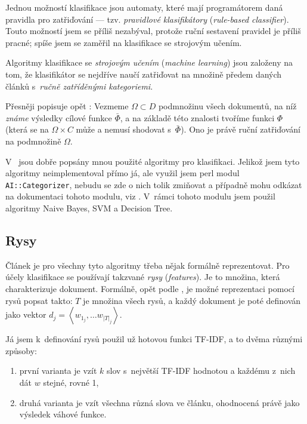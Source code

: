 \documentclass[12pt,a4paper]{report}
\begin{document}
Jednou možností klasifikace jsou automaty, které mají programátorem daná pravidla pro zatřiďování --- tzv. \emph{pravidlové klasifikátory} (\emph{rule-based classifier}). Touto možností jsem se příliš nezabýval, protože ruční sestavení pravidel je příliš pracné; spíše jsem se zaměřil na klasifikace se strojovým učením.

Algoritmy klasifikace se \emph{strojovým učením} (\emph{machine learning}) jsou založeny na tom, že klasifikátor se nejdříve naučí zatřiďovat na množině předem daných článků s~\emph{ručně zatříděnými kategoriemi}.

Přesněji popisuje opět \cite{machine_intro}: Vezmeme $\Omega \subset D$ podmnožinu všech dokumentů, na níž \emph{známe} výsledky cílové funkce $\bar{\Phi}$, a na základě této znalosti tvoříme funkci $\Phi$ (která se na $\Omega\times C$ může a nemusí shodovat s~$\bar{\Phi}$). Ono  je právě ruční zatřiďování na podmnožině $\Omega$.

V~\cite{machine_intro} jsou dobře popsány mnou použité algoritmy pro klasifikaci. Jelikož jsem tyto algoritmy neimplementoval přímo já, ale využil jsem perl modul \texttt{AI::Categorizer}, nebudu se zde o nich tolik zmiňovat a případně mohu odkázat na dokumentaci tohoto mo\-du\-lu, viz \cite{algorithmnaivebayes}. V~rámci tohoto mo\-du\-lu jsem použil algoritmy Naive Bayes, SVM a Decision Tree. 


\subsection{Rysy}

Článek je pro všechny tyto algoritmy třeba nějak formálně reprezentovat. Pro účely klasifikace se používají takzvané \emph{rysy} (\emph{features}). Je to množina, která charakterizuje dokument. Formálně, opět podle \cite{machine_intro}, je možné reprezentaci pomocí rysů popsat takto: $T$ je množina všech rysů, a každý dokument je poté definován jako vektor $d_j=\left<w_{1_j}, \ldots w_{\left|T\right|_j}\right>$.

Já jsem k~definování rysů použil už hotovou funkci TF-IDF, a to dvěma různými způsoby:

\begin{enumerate}
    \item první varianta je vzít $k$ slov s~největší TF-IDF hodnotou a každému z~nich dát $w$ stejné, rovné 1,
    \item druhá varianta je vzít všechna různá slova ve článku, ohodnocená právě jako výsledek váhové funkce.
\end{enumerate}
\end{document}
